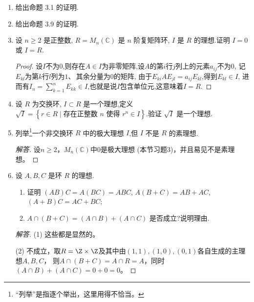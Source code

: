 \begin{enumerate}

\item 给出命题 3.1 的证明.

\item 给出命题 3.9 的证明.

\item 设 $n \geqslant 2$ 是正整数, $R = M_n(\mathbb{C})$ 是 $n$ 阶复矩阵环, $I$ 是 $R$ 的理想.证明 $I = 0$ 或 $I = R$.
\begin{proof}
    设$I$不为$0$,则存在$A\in I$为非零矩阵,设$A$的第$i$行$j$列上的元素$a_{ij}$不为$0$,
    记$E_{kl}$为第$k$行$l$列为$1$、\,其余分量为$0$的矩阵,
    由于$E_{ki}AE_{jl}=a_{ij}E_{kl}$,得到$E_{kl} \in I$,
    进而有$I_n=\sum\limits_{k=1}^nE_{kk} \in I$,也就是说$I$包含单位元,这意味着$I=R$.
\end{proof}
\item 设 $R$ 为交换环, $I \subset R$ 是一个理想,定义 $\sqrt{I} = \left\{ r \in R \mid \text{存在正整数 } n \text{ 使得 } r^n \in I \right\}$.验证 $\sqrt{I}$ 是一个理想.

\item 列举\footnote{``列举''是指逐个举出，这里用得不恰当。}一个非交换环 $R$ 中的极大理想 $I$,但 $I$ 不是 $R$ 的素理想.\printfootnotes
\begin{proof}[解答]
    设$n\geqslant2$，$M_n(\mathbb{C})$中$0$是极大理想 (本节习题3)，并且易见不是素理想。
\end{proof}

\item 设 $A, B, C$ 是环 $R$ 的理想.
\begin{enumerate}[label=(\arabic*)]
    \item 证明 $(AB)C = A(BC) = ABC$, $A(B + C) = AB + AC$, $(A + B)C = AC + BC$;
    \item $A \cap (B + C) = (A \cap B) + (A \cap C)$ 是否成立?说明理由.
\end{enumerate}
\begin{proof}[解答]
    (1) 这些都是显然的。

    (2) 不成立，取$R=\Z\times\Z$及其中由$(1,1),(1,0),(0,1)$各自生成的主理想$A,B,C$，
    则$A\cap(B+C)=A \cap R=A$，同时$(A \cap B)+(A \cap C)=0+0=0$。
\end{proof}


\end{enumerate}
